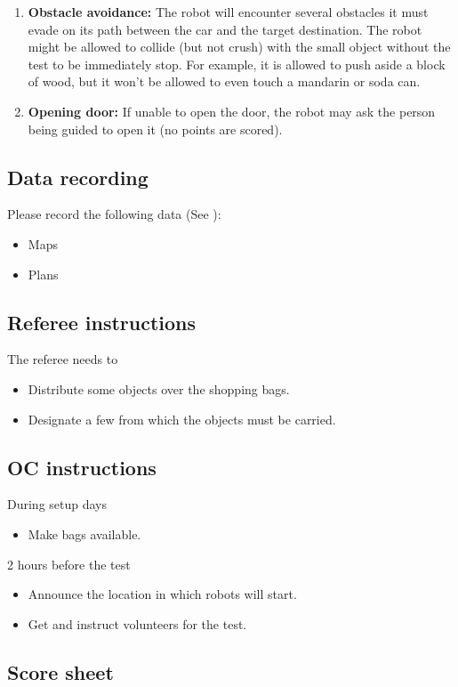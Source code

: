 \begin{enumerate}
  \item \textbf{Obstacle avoidance:} The robot will encounter several obstacles it must evade on its path between the car and the target destination.
  The robot might be allowed to collide (but not crush) with the small object without the test to be immediately stop. For example, it is allowed to push aside a block of wood, but it won't be allowed to even touch a mandarin or soda can.

  \item \textbf{Opening door:} If unable to open the door, the robot may ask the person being guided to open it (no points are scored).

\end{enumerate}

\subsection{Data recording}
  Please record the following data (See ):
\begin{itemize}
 \item Maps
 \item Plans
\end{itemize}

\subsection{Referee instructions}

The referee needs to
\begin{itemize}
  \item Distribute some objects over the shopping bags.
  \item Designate a few  from which the objects must be carried.
\end{itemize}

\subsection{OC instructions}

During setup days
\begin{itemize}
  \item Make bags available.
\end{itemize}

2 hours before the test
\begin{itemize}
  \item Announce the location in which robots will start.
  \item Get and instruct volunteers for the test.
\end{itemize}

\newpage
\subsection{Score sheet}

